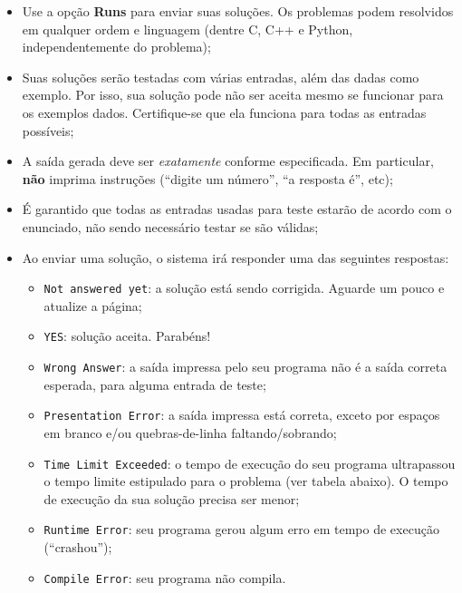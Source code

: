 \documentclass[12pt,oneside]{article} %
\begin{document}
\begin{itemize}

    \item Use a opção \textbf{Runs} para enviar suas soluções. Os problemas podem resolvidos em qualquer ordem e
    linguagem (dentre C, C++ e Python, independentemente do problema);

    \item Suas soluções serão testadas com várias entradas,
    além das dadas como exemplo. Por isso, sua solução pode não ser
    aceita mesmo se funcionar para os exemplos dados. Certifique-se que ela
    funciona para todas as entradas possíveis;

    \item A saída gerada deve ser \textit{exatamente} conforme
    especificada. Em particular, \textbf{não} imprima instruções (``digite um
            número'', ``a resposta é'', etc);

    \item É garantido que todas as entradas usadas para teste estarão de acordo
    com o enunciado, não sendo necessário testar se são válidas;

    \item Ao enviar uma solução, o sistema irá responder uma das
    seguintes respostas:
    \begin{itemize}
        \item \verb|Not answered yet|: a solução está sendo corrigida.
        Aguarde um pouco e atualize a página;
        \item \verb|YES|: solução aceita. Parabéns!
        \item \verb|Wrong Answer|: a saída impressa pelo seu programa não é a
        saída correta esperada, para alguma entrada de teste;
        \item \verb|Presentation Error|: a saída impressa está correta, exceto
        por espaços em branco e/ou quebras-de-linha faltando/sobrando;
        \item \verb|Time Limit Exceeded|: o tempo de execução do seu programa
        ultrapassou o tempo limite estipulado para o problema (ver tabela
        abaixo). O tempo de execução da sua solução precisa ser menor;
        \item \verb|Runtime Error|: seu programa gerou algum erro em tempo de
        execução (``crashou'');
        \item \verb|Compile Error|: seu programa não compila.
    \end{itemize}


\end{itemize}
\end{document}
